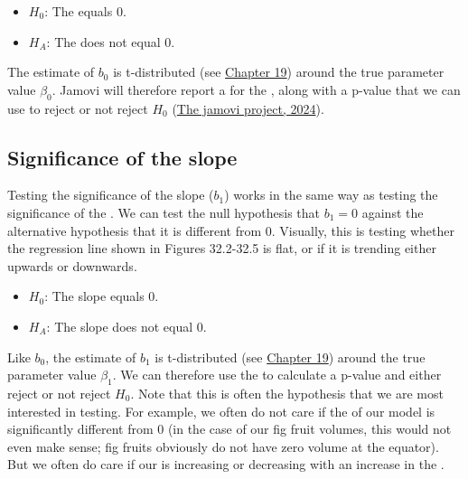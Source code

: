 \documentclass[
  openany]{krantz}
\providecommand{\tightlist}{%
  \setlength{\itemsep}{0pt}\setlength{\parskip}{0pt}}
\begin{document}
\begin{itemize}
\tightlist
\item
  \(H_{0}\): The  equals 0.
\item
  \(H_{A}\): The  does not equal 0.
\end{itemize}

The estimate of \(b_{0}\) is t-distributed (see \protect\hyperlink{Chapter_19}{Chapter 19}) around the true parameter value \(\beta_{0}\).
Jamovi will therefore report a  for the , along with a p-value that we can use to reject or not reject \(H_{0}\) (\protect\hyperlink{ref-Jamovi2022}{The jamovi project, 2024}).

\hypertarget{significance-of-the-slope}{%
\subsection{Significance of the slope}\label{significance-of-the-slope}}

Testing the significance of the slope (\(b_{1}\)) works in the same way as testing the significance of the .
We can test the null hypothesis that \(b_{1} = 0\) against the alternative hypothesis that it is different from 0.
Visually, this is testing whether the regression line shown in Figures 32.2-32.5 is flat, or if it is trending either upwards or downwards.

\begin{itemize}
\tightlist
\item
  \(H_{0}\): The slope equals 0.
\item
  \(H_{A}\): The slope does not equal 0.
\end{itemize}

Like \(b_{0}\), the estimate of \(b_{1}\) is t-distributed (see \protect\hyperlink{Chapter_19}{Chapter 19}) around the true parameter value \(\beta_{1}\).
We can therefore use the  to calculate a p-value and either reject or not reject \(H_{0}\).
Note that this is often the hypothesis that we are most interested in testing.
For example, we often do not care if the  of our model is significantly different from 0 (in the case of our fig fruit volumes, this would not even make sense; fig fruits obviously do not have zero volume at the equator).
But we often do care if our  is increasing or decreasing with an increase in the .
\end{document}

